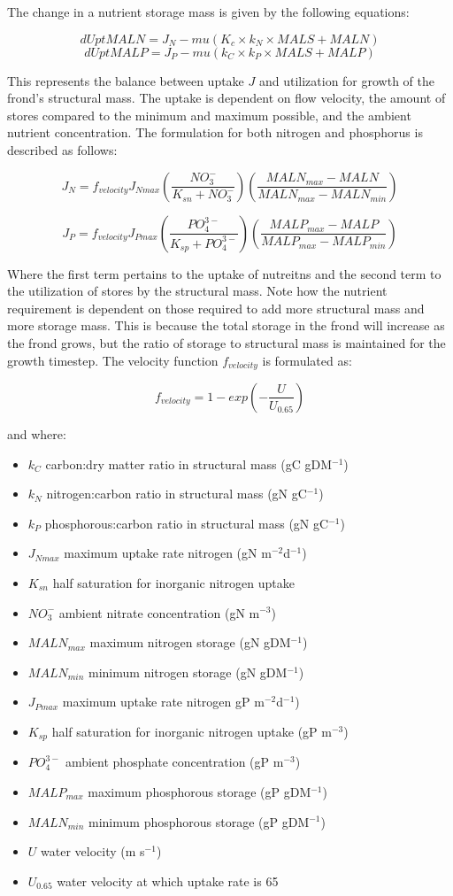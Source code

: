 \documentclass{article}
\begin{document}
The change in a nutrient storage mass is given by the following equations:

\[dUptMALN = J_N - mu(K_c \times k_N \times MALS + MALN)\]
\[dUptMALP = J_P - mu(k_C \times k_P \times MALS + MALP)\]

This represents the balance between uptake $J$ and utilization for growth of the frond's structural mass. The uptake is dependent on flow velocity, the amount of stores compared to the minimum and maximum possible, and the ambient nutrient concentration. The formulation for both nitrogen and phosphorus is described as follows:

\[J_N = f_{velocity}J_{Nmax}(\frac{NO_3^-}{K_{sn}+NO_3^-})(\frac{MALN_{max}-MALN}{MALN_{max}-MALN_{min}})\]

\[J_P = f_{velocity}J_{Pmax}(\frac{PO_4^{3-}}{K_{sp}+PO_4^{3-}})(\frac{MALP_{max}-MALP}{MALP_{max}-MALP_{min}})\]

Where the first term pertains to the uptake of nutreitns and the second term to the utilization of stores by the structural mass. Note how the nutrient requirement is dependent on those required to add more structural mass and more storage mass. This is because the total storage in the frond will increase as the frond grows, but the ratio of storage to structural mass is maintained for the growth timestep. The velocity function $f_{velocity}$ is formulated as:

\[f_{velocity} = 1-exp(-\frac{U}{U_{0.65}})\]

and where:

\begin{itemize}
\item $k_C$        carbon:dry matter ratio in structural mass (gC gDM$^{-1}$)
\item $k_N$        nitrogen:carbon ratio in structural mass (gN gC$^{-1}$)
\item $k_P$        phosphorous:carbon ratio in structural mass (gN gC$^{-1}$)
\item $J_{Nmax}$   maximum uptake rate nitrogen (gN m$^{-2}$d$^{-1}$)
\item $K_{sn}$     half saturation for inorganic nitrogen uptake
\item $NO_3^-$     ambient nitrate concentration (gN m$^{-3}$)
\item $MALN_{max}$ maximum nitrogen storage (gN gDM$^{-1}$)
\item $MALN_{min}$ minimum nitrogen storage (gN gDM$^{-1}$)
\item $J_{Pmax}$   maximum uptake rate nitrogen gP m$^{-2}$d$^{-1}$)
\item $K_{sp}$     half saturation for inorganic nitrogen uptake (gP m$^{-3}$)
\item $PO_4^{3-}$  ambient phosphate concentration (gP m$^{-3}$)
\item $MALP_{max}$ maximum phosphorous storage (gP gDM$^{-1}$)
\item $MALN_{min}$ minimum phosphorous storage (gP gDM$^{-1}$)
\item $U$          water velocity (m s$^{-1}$)
\item $U_{0.65}$   water velocity at which uptake rate is 65%
\end{itemize}
\end{document}
